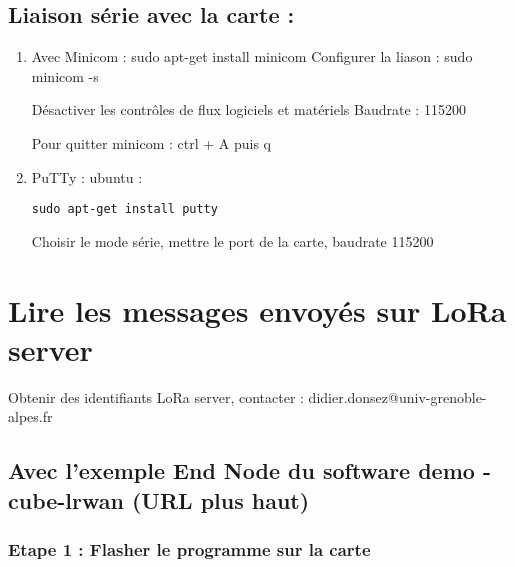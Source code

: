 \documentclass{article}
\begin{document}
\subsection{Liaison série avec la carte :}

\begin{enumerate}
\item
Avec Minicom : sudo apt-get install minicom
Configurer la liason : sudo minicom -s

Désactiver les contrôles de flux logiciels et matériels
Baudrate : 115200


Pour quitter minicom : ctrl + A puis q


\item PuTTy : ubuntu : 
\begin{verbatim}
sudo apt-get install putty
\end{verbatim}
Choisir le mode série, mettre le port de la carte, baudrate 115200

\end{enumerate}




\section{Lire les messages envoyés sur LoRa server}

Obtenir des identifiants LoRa server, contacter : didier.donsez@univ-grenoble-alpes.fr



\subsection{Avec l'exemple End Node  du software demo -cube-lrwan (URL plus haut)}

\subsubsection{Etape 1 : Flasher le programme sur la carte}
\end{document}
